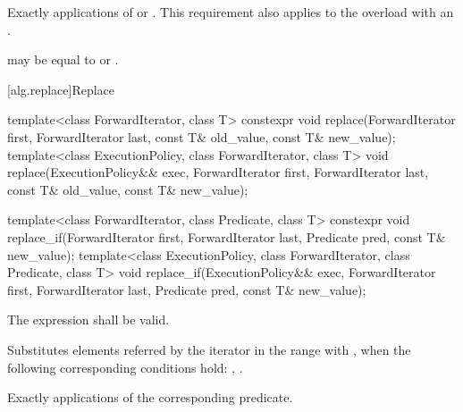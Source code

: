 \begin{itemdescr}
\pnum
\complexity
Exactly
 
applications of
 or .
This requirement also applies to the overload with an .

\pnum
\remarks
{} may be equal  to  or 
.
\end{itemdescr}


[alg.replace]{Replace}

%
%
\begin{itemdecl}
template<class ForwardIterator, class T>
  constexpr void replace(ForwardIterator first, ForwardIterator last,
                         const T& old_value, const T& new_value);
template<class ExecutionPolicy, class ForwardIterator, class T>
  void replace(ExecutionPolicy&& exec,
               ForwardIterator first, ForwardIterator last,
               const T& old_value, const T& new_value);

template<class ForwardIterator, class Predicate, class T>
  constexpr void replace_if(ForwardIterator first, ForwardIterator last,
                            Predicate pred, const T& new_value);
template<class ExecutionPolicy, class ForwardIterator, class Predicate, class T>
  void replace_if(ExecutionPolicy&& exec,
                  ForwardIterator first, ForwardIterator last,
                  Predicate pred, const T& new_value);
\end{itemdecl}

\begin{itemdescr}
\pnum
\requires
The expression
shall be valid.

\pnum
\effects
Substitutes elements referred by the iterator
in the range 
with ,
when the following corresponding conditions hold:
, .

\pnum
\complexity
Exactly
applications of the corresponding predicate.
\end{itemdescr}

